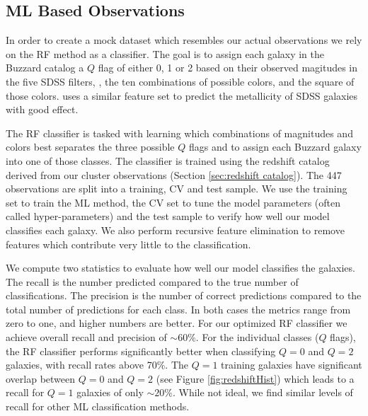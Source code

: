 \subsection{ML Based Observations}
In order to create a mock dataset which resembles our actual observations we rely on the RF method as a classifier. The goal is to assign each galaxy in the Buzzard catalog a $Q$ flag of either 0, 1 or 2 based on their observed magitudes in the five SDSS filters, \sdssu\sdssg\sdssr\sdssi\sdssz, the ten combinations of possible colors, and the square of those colors. \cite{Acquaviva2016} uses a similar feature set to predict the metallicity of SDSS galaxies with good effect. 

The RF classifier is tasked with learning which combinations of magnitudes and colors best separates the three possible $Q$ flags and to assign each Buzzard galaxy into one of those classes. The classifier is trained using the redshift catalog derived from our cluster observations (Section \ref{sec:redshift catalog}). The 447 observations are split into a training, CV and test sample. We use the training set to train the ML method, the CV set to tune the model parameters (often called hyper-parameters) and the test sample to verify how well our model classifies each galaxy. We also perform recursive feature elimination to remove features which contribute very little to the classification.

We compute two statistics to evaluate how well our model classifies the galaxies. The recall is the number predicted compared to the true number of classifications. The precision is the number of correct predictions compared to the total number of predictions for each class. In both cases the metrics range from zero to one, and higher numbers are better. For our optimized RF classifier we achieve overall recall and precision of $\sim60\%$. For the individual classes ($Q$ flags), the RF classifier performs significantly better when classifying $Q=0$ and $Q=2$ galaxies, with recall rates above 70\%. The $Q=1$ training galaxies have significant overlap between $Q=0$ and $Q=2$ (see Figure \ref{fig:redshiftHist}) which leads to a recall for $Q=1$ galaxies of only $\sim20\%$. While not ideal, we find similar levels of recall for other ML classification methods.

